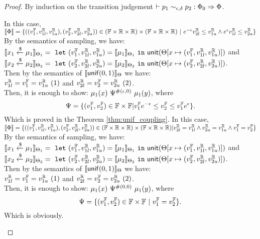 \documentclass[a4paper,11pt]{article}
\begin{document}
\begin{proof}
By induction on the transition judgement $\vdash p_1	
\sim_{\epsilon, \delta} 
p_2 :
\Phi_0 \Rightarrow \Phi $.
\begin{itemize}
	In this case, 
	$\llbracket \Phi \rrbracket = 
	\{((v^{\mathbb{F}}_1, v^{\mathbb{R}}_{1l}, v^{\mathbb{R}}_{1u}), (v^{\mathbb{F}}_2, v^{\mathbb{R}}_{2l}, v^{\mathbb{R}}_{2u})) 
	\in (\mathbb{F} \times \mathbb{R} \times \mathbb{R}) \times (\mathbb{F} \times \mathbb{R} \times \mathbb{R})
	~|~
	e^{-\epsilon} v^{\mathbb{R}}_{2l} \leq v^{\mathbb{R}}_{1u}
	\land
	e^{\epsilon} v^{\mathbb{R}}_{1l} \leq v^{\mathbb{R}}_{2u}
	\}$
	\\
	By the semantics of sampling, we have:\\
	$\llbracket x_1 \xleftarrow{\$} \mu_1 \rrbracket_{\Theta_1} = 
	~\mathtt{let}~ (v^{\mathbb{F}}_1, v^{\mathbb{R}}_{1l}, v^{\mathbb{R}}_{1u}) 
	= \llbracket \mu_1 \rrbracket_{\Theta_1} 
	~\mathtt{in}~ 
	\mathsf{unit}(\Theta[x \mapsto (v^{\mathbb{F}}_1, v^{\mathbb{R}}_{1l}, v^{\mathbb{R}}_{1u})])
	$ and 
	$\llbracket x_2 \xleftarrow{\$} \mu_2 \rrbracket_{\Theta_2} = 
	~\mathtt{let}~ (v^{\mathbb{F}}_2, v^{\mathbb{R}}_{2l}, v^{\mathbb{R}}_{2u}) 
	= \llbracket \mu_2 \rrbracket_{\Theta_2} 
	~\mathtt{in}~ 
	\mathsf{unit}(\Theta[x \mapsto (v^{\mathbb{F}}_2, v^{\mathbb{R}}_{2l}, v^{\mathbb{R}}_{2u})])
	$. \\
	Then by the semantics of $\llbracket \mathsf{unif}(0, 1) \rrbracket_{\Theta}$ we have:
	\\
	$ v^{\mathbb{R}}_{1l} = v^{\mathbb{F}}_1 = v^{\mathbb{R}}_{1u} ~ (1)$ 
	and
	$ v^{\mathbb{R}}_{2l} = v^{\mathbb{F}}_2 = v^{\mathbb{R}}_{2u} ~ (2)$.
	\\
	Then, it is enough to show:
	${\mu_1}(x) ~ \Psi^{\#(\epsilon, 0)} ~ {\mu_1}(y)$, where
	\[
		\Psi = \{(v^{\mathbb{F}}_1, v^{\mathbb{F}}_2) \in \mathbb{F} \times \mathbb{F}
		| 
		v^{\mathbb{F}}_1 e^{-\epsilon} 
		\leq v^{\mathbb{F}}_2
		\leq v^{\mathbb{F}}_1 e^{\epsilon} \}.
	\]
	Which is proved in the Theorem \ref{thm:unif_coupling}.
	In this case, 
	$\llbracket \Phi \rrbracket = 
	\{((v^{\mathbb{F}}_1, v^{\mathbb{R}}_{1l}, v^{\mathbb{R}}_{1u}), (v^{\mathbb{F}}_2, v^{\mathbb{R}}_{2l}, v^{\mathbb{R}}_{2u})) 
	\in (\mathbb{F} \times \mathbb{R} \times \mathbb{R}) \times (\mathbb{F} \times \mathbb{R} \times \mathbb{R})
	|
	v^{\mathbb{R}}_{2l} = v^{\mathbb{R}}_{1l}
	\land
	v^{\mathbb{R}}_{2u} = v^{\mathbb{R}}_{1u}
	\land
	v^{\mathbb{F}}_1 = v^{\mathbb{F}}_2
	\}$
	\\
	By the semantics of sampling, we have:\\
	$\llbracket x_1 \xleftarrow{\$} \mu_1 \rrbracket_{\Theta_1} = 
	~\mathtt{let}~ (v^{\mathbb{F}}_1, v^{\mathbb{R}}_{1l}, v^{\mathbb{R}}_{1u}) 
	= \llbracket \mu_1 \rrbracket_{\Theta_1} 
	~\mathtt{in}~ 
	\mathsf{unit}(\Theta[x \mapsto (v^{\mathbb{F}}_1, v^{\mathbb{R}}_{1l}, v^{\mathbb{R}}_{1u})])
	$ and 
	$\llbracket x_2 \xleftarrow{\$} \mu_2 \rrbracket_{\Theta_2} = 
	~\mathtt{let}~ (v^{\mathbb{F}}_2, v^{\mathbb{R}}_{2l}, v^{\mathbb{R}}_{2u}) 
	= \llbracket \mu_2 \rrbracket_{\Theta_2} 
	~\mathtt{in}~ 
	\mathsf{unit}(\Theta[x \mapsto (v^{\mathbb{F}}_2, v^{\mathbb{R}}_{2l}, v^{\mathbb{R}}_{2u})])
	$. \\
	Then by the semantics of $\llbracket \mathsf{unif}(0, 1) \rrbracket_{\Theta}$ we have:
	\\
	$ v^{\mathbb{R}}_{1l} = v^{\mathbb{F}}_1 = v^{\mathbb{R}}_{1u} ~ (1)$ 
	and
	$ v^{\mathbb{R}}_{2l} = v^{\mathbb{F}}_2 = v^{\mathbb{R}}_{2u} ~ (2)$.
	\\
	Then, it is enough to show:
	${\mu_1}(x) ~ \Psi^{\#(0, 0)} ~ {\mu_1}(y)$, where
	\[
		\Psi = \{(v^{\mathbb{F}}_1, v^{\mathbb{F}}_2) \in \mathbb{F} \times \mathbb{F}
		~| ~
		v^{\mathbb{F}}_1 = v^{\mathbb{F}}_2 \}.
	\]
	Which is obviously.
	\end{itemize}
\end{proof}
\end{document}
